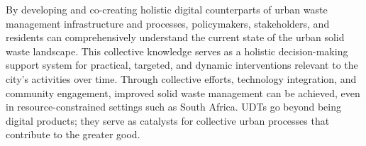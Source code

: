 \documentclass[authoryear,preprint,review,doubleblind, 12pt]{elsarticle}
\begin{document}
     By developing and co-creating holistic digital counterparts of urban waste management infrastructure and processes, policymakers, stakeholders, and residents can comprehensively understand the current state of the urban solid waste landscape. This collective knowledge serves as a holistic decision-making support system for practical, targeted, and dynamic interventions relevant to the city's activities over time. Through collective efforts, technology integration, and community engagement, improved solid waste management can be achieved, even in resource-constrained settings such as South Africa. UDTs go beyond being digital products; they serve as catalysts for collective urban processes that contribute to the greater good.

    \footnotesize
     
    
    \appendix \label{appendix}
    
\end{document}
